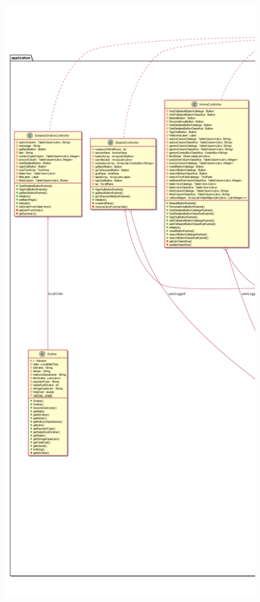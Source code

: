 \documentclass[a4paper,12pt,titlepage]{article}
\begin{document}
{{{\begin{figure}[H]
		\includegraphics[scale=0.21]{classDiagramParte1}
\end{figure}
\begin{figure}[H]
		\centering

\end{figure}}}}
\end{document}
